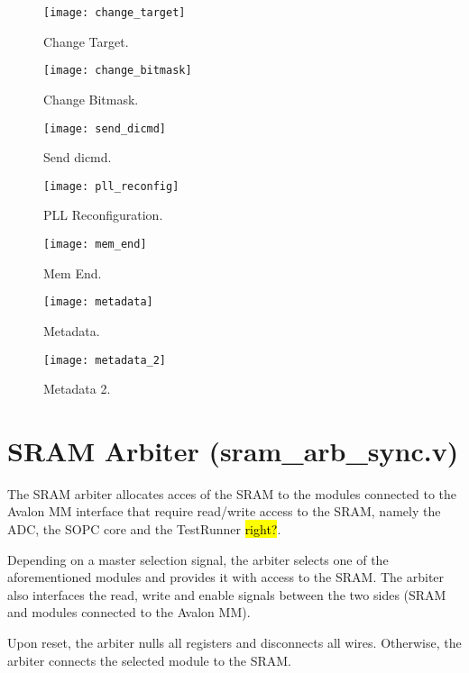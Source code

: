 
\begin{figure}[h!]
 \centering
 \texttt{[image: change\_target]}
 \caption{Change Target.}
 \label{fig:change_target}
\end{figure}





\begin{figure}[h!]
 \centering
 \texttt{[image: change\_bitmask]}
 \caption{Change Bitmask.}
 \label{fig:change_bitmask}
\end{figure}




\begin{figure}[h!]
 \centering
 \texttt{[image: send\_dicmd]}
 \caption{Send dicmd.}
 \label{fig:send_dicmd}
\end{figure}




\begin{figure}[h!]
 \centering
 \texttt{[image: pll\_reconfig]}
 \caption{PLL Reconfiguration.}
 \label{fig:pll_reconfig}
\end{figure}



\begin{figure}[h!]
 \centering
 \texttt{[image: mem\_end]}
 \caption{Mem End.}
 \label{fig:mem_end}
\end{figure}




\begin{figure}[h!]
 \centering
 \texttt{[image: metadata]}
 \caption{Metadata.}
 \label{fig:metadata}
\end{figure}




\begin{figure}[h!]
 \centering
 \texttt{[image: metadata\_2]}
 \caption{Metadata 2.}
 \label{fig:metadata_2}
\end{figure}


\section{SRAM Arbiter (sram\_arb\_sync.v)}

The SRAM arbiter allocates acces of the SRAM to the modules connected to the Avalon MM interface that require read/write access to the SRAM, namely the ADC, the SOPC core and the TestRunner \hl{right?}.

Depending on a master selection signal, the arbiter selects one of the aforementioned modules and provides it with access to the SRAM. The arbiter also interfaces the read, write and enable signals between the two sides (SRAM and modules connected to the Avalon MM).

Upon reset, the arbiter nulls all registers and disconnects all wires. Otherwise, the arbiter connects the selected module to the SRAM.
